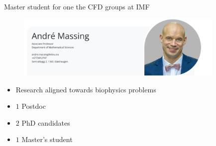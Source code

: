 \begin{frame}{Master student for one the CFD groups at IMF}
    \begin{figure}
        \centering
        \includegraphics[width=10cm]{figures/AndreMassing.png}
    \end{figure}

    \begin{block}{}
        \begin{itemize}
            \item Research aligned towards biophysics problems
            \item $1 $ Postdoc
            \item $2 $ PhD candidates
            \item $1 $ Master's student
        \end{itemize}
    \end{block}
\end{frame}

